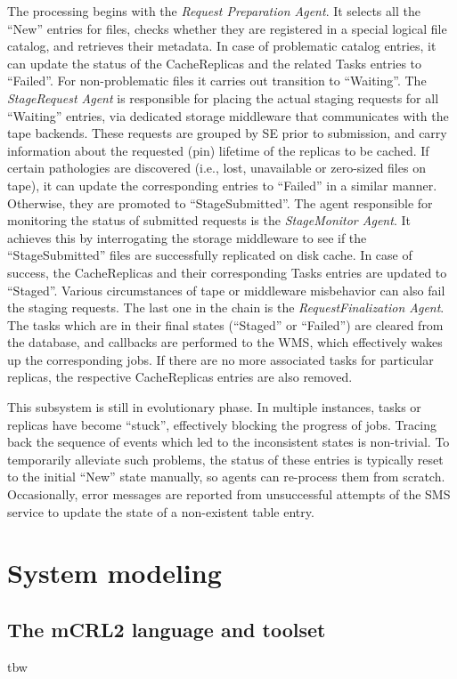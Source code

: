 \documentclass[10pt,conference]{IEEEtran}
\begin{document}
The processing begins with the \textit{Request Preparation Agent}. It selects all the
``New'' entries for files, checks whether they are registered in a special logical
file catalog, and retrieves their metadata. In case of problematic catalog
entries, it can update the status of the CacheReplicas and the related Tasks
entries to ``Failed''. For non-problematic files it carries out transition to
``Waiting''. The \textit{StageRequest Agent} is responsible for placing the actual staging
requests for all ``Waiting'' entries, via dedicated storage middleware that
communicates with the tape backends. These requests are grouped by SE prior to
submission, and carry information about the requested (pin) lifetime of the
replicas to be cached. If certain pathologies are discovered (i.e., lost,
unavailable or zero-sized files on tape), it can update the corresponding
entries to ``Failed'' in a similar manner. Otherwise, they are promoted to
``StageSubmitted''. The agent responsible for monitoring the status of submitted
requests is the \textit{StageMonitor Agent}. It achieves this by interrogating the
storage middleware to see if the ``StageSubmitted'' files are successfully
replicated on disk cache. In case of success, the CacheReplicas and their
corresponding Tasks entries are updated to ``Staged''. Various circumstances of
tape or middleware misbehavior can also fail the staging requests. The last one
in the chain is the \textit{RequestFinalization Agent}. The tasks which are in their
final states (``Staged'' or ``Failed'') are cleared from the database, and callbacks
are performed to the WMS, which effectively wakes up the corresponding jobs. If
there are no more associated tasks for particular replicas, the respective
CacheReplicas entries are also removed.

This subsystem is still in evolutionary phase. In multiple instances, tasks or
replicas have become “stuck”, effectively blocking the progress of jobs. Tracing
back the sequence of events which led to the inconsistent states is non-trivial.
To temporarily alleviate such problems, the status of these entries is typically
reset to the initial “New” state manually, so agents can re-process them from
scratch. Occasionally, error messages are reported from unsuccessful attempts of
the SMS service to update the state of a non-existent table entry.

\section{System modeling}
\subsection{The mCRL2 language and toolset}
tbw
\end{document}
